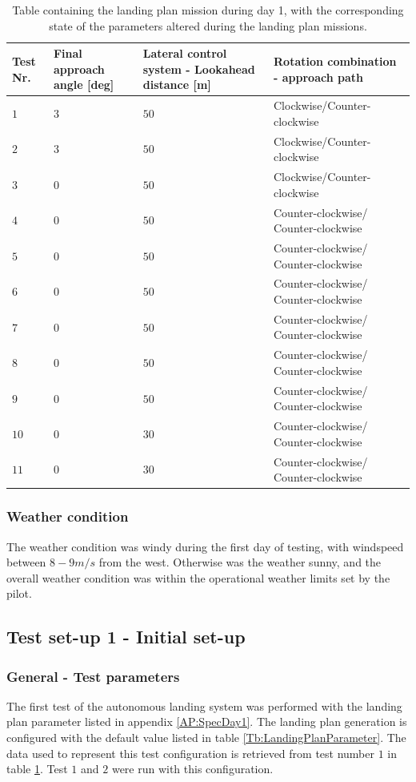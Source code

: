 \begin{table}[H]
\begin{tabular}{| p{0.5cm} | p{3cm} | p{4cm} | p{4cm} |}
\hline
\textbf{Test Nr.} & \textbf{Final approach angle [deg]} & \textbf{Lateral control system - Lookahead distance [m]} &  \textbf{Rotation combination - approach path}\\ \hline
$1$				& $3$ &	$ 50 $ 	& Clockwise/Counter-clockwise		\\ \hline
$2$				& $3$ & $ 50 $	& Clockwise/Counter-clockwise			\\ \hline
$3$				& $0$ & $ 50 $	& Clockwise/Counter-clockwise		\\ \hline
$4$				& $0$ & $ 50 $ 	& Counter-clockwise/ Counter-clockwise				\\ \hline
$5$				& $0$ & $ 50 $ & Counter-clockwise/ Counter-clockwise					\\ \hline
$6$				& $0$ & $ 50 $	& Counter-clockwise/ Counter-clockwise				\\ \hline
$7$				& $0$ &	$ 50 $ & Counter-clockwise/ Counter-clockwise				\\ \hline
$8$				& $0$ & $ 50 $	& Counter-clockwise/ Counter-clockwise				\\ \hline
$9$				& $0$ & $ 50 $ & Counter-clockwise/ Counter-clockwise			\\ \hline
$10$			& $0$ &	$ 30 $ & Counter-clockwise/ Counter-clockwise	\\ \hline
$11$			& $0$ & $ 30 $ & Counter-clockwise/ Counter-clockwise\\ \hline
\end{tabular}
\caption{Table containing the landing plan mission during day 1, with the corresponding state of the parameters altered during the landing plan missions.}
\label{tb:Day1ParameterAlteration}
\end{table}
\subsubsection{Weather condition}
The weather condition was windy during the first day of testing, with windspeed between $8-9 m/s$ from the west. Otherwise was the weather sunny, and the overall weather condition was within the operational weather limits set by the pilot.
\subsection{Test set-up 1 - Initial set-up}\label{ss:TestSetup1}
\subsubsection{General - Test parameters}\label{ss:TestParaInitiDay1}
The first test of the autonomous landing system was performed with the landing plan parameter listed in appendix \ref{AP:SpecDay1}. The landing plan generation is configured with the default value listed in table \ref{Tb:LandingPlanParameter}. The data used to represent this test configuration is retrieved from test number $1$ in table \ref{tb:Day1ParameterAlteration}. Test $1$ and $2$ were run with this configuration.

